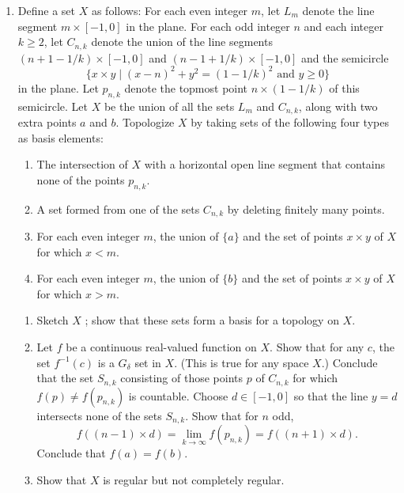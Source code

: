 \begin{enumerate}[itemsep=0.4em, parsep=0pt, topsep=0pt, partopsep=0pt, leftmargin=*, label=\arabic*., ref=\arabic*]
\item[*11.] Define a set \(X\) as follows: For each even integer \(m\), let \(L_{m}\) denote the line segment \(m \times [ {-1,0}]\) in the plane. For each odd integer \(n\) and each integer \(k \geq 2\), let \(C_{n,k}\) denote the union of the line segments \(( {n + 1 - 1/k}) \times [ {-1,0}]\) and \(( {n - 1 + 1/k}) \times [ {-1,0}]\) and the semicircle \[ \{ x \times y \mid {( x - n) }^{2} + y^{2} = {( 1 - 1/k) }^{2}\text{ and }y \geq 0\} \] in the plane. Let \(p_{n,k}\) denote the topmost point \(n \times ( {1 - 1/k})\) of this semicircle. Let \(X\) be the union of all the sets \(L_{m}\) and \(C_{n,k}\), along with two extra points \(a\) and \(b\). Topologize \(X\) by taking sets of the following four types as basis elements:
 \begin{enumerate}[itemsep=0.2em, parsep=0pt, topsep=0pt, partopsep=0pt, leftmargin=*, label=(\roman*), align=left]
   \item The intersection of \(X\) with a horizontal open line segment that contains none of the points \(p_{n,k}\).
   \item A set formed from one of the sets \(C_{n,k}\) by deleting finitely many points.
   \item For each even integer \(m\), the union of \(\{ a\}\) and the set of points \(x \times y\) of \(X\) for which \(x < m\).
   \item For each even integer \(m\), the union of \(\{ b\}\) and the set of points \(x \times y\) of \(X\) for which \(x > m\).
   \end{enumerate}
 \begin{enumerate}[itemsep=0.2em, parsep=0pt, topsep=0pt, partopsep=0pt, leftmargin=*, label=(\alph*), align=left]
 \item Sketch \(X\) ; show that these sets form a basis for a topology on \(X\).
 \item Let \(f\) be a continuous real-valued function on \(X\). Show that for any \(c\), the set \(f^{-1}( c)\) is a \(G_{\delta }\) set in \(X\). (This is true for any space \(X\).) Conclude that the set \(S_{n,k}\) consisting of those points \(p\) of \(C_{n,k}\) for which \(f( p) \neq f( p_{n,k})\) is countable. Choose \(d \in [ {-1,0}]\) so that the line \(y = d\) intersects none of the sets \(S_{n,k}\). Show that for \(n\) odd, \[ f( {( {n - 1}) \times d}) = \mathop{\lim }\limits_{{k \rightarrow \infty }}f( p_{n,k}) = f( {( {n + 1}) \times d}). \] Conclude that \(f( a) = f( b)\).
 \item Show that \(X\) is regular but not completely regular. 
 \end{enumerate}
\end{enumerate}

